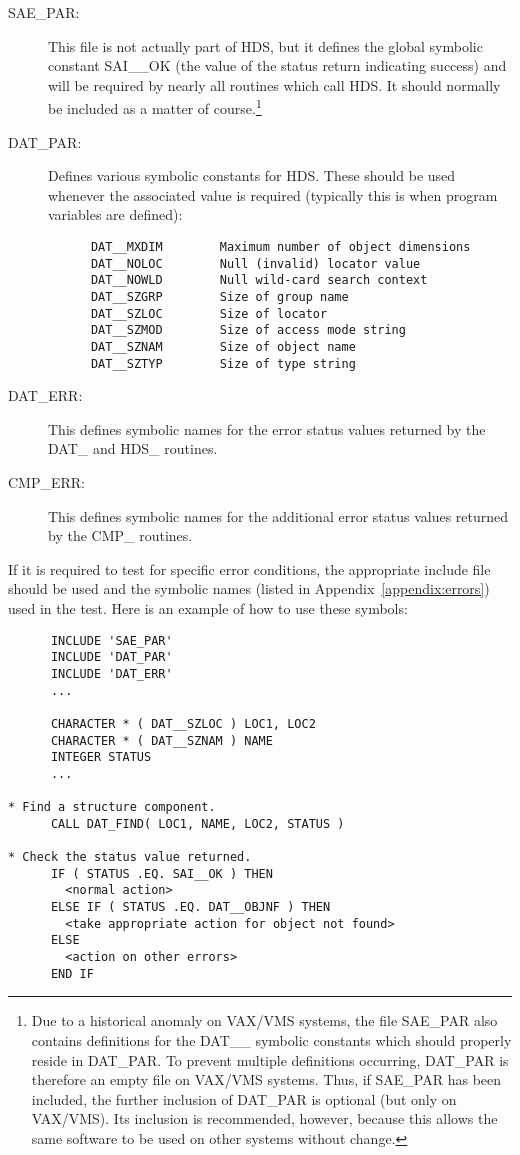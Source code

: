 \begin{description}

\item [SAE\_PAR:]
This file is not actually part of HDS, but it defines the global symbolic
constant SAI\_\_OK (the value of the status return indicating success) and will
be required by nearly all routines which call HDS. It should normally be
included as a matter of course.\footnote{Due to a historical anomaly on VAX/VMS
systems, the file SAE\_PAR also contains definitions for the DAT\_\_ symbolic
constants which should properly reside in DAT\_PAR. To prevent multiple
definitions occurring, DAT\_PAR is therefore an empty file on VAX/VMS systems.
Thus, if SAE\_PAR has been included, the further inclusion of DAT\_PAR is
optional (but only on VAX/VMS). Its inclusion is recommended, however, because
this allows the same software to be used on other systems without change.}

\item [DAT\_PAR:]
Defines various symbolic constants for HDS. These should be used whenever the
associated value is required (typically this is when program variables are
defined): 

\small
\begin{verbatim}
      DAT__MXDIM        Maximum number of object dimensions
      DAT__NOLOC        Null (invalid) locator value
      DAT__NOWLD        Null wild-card search context
      DAT__SZGRP        Size of group name
      DAT__SZLOC        Size of locator
      DAT__SZMOD        Size of access mode string
      DAT__SZNAM        Size of object name
      DAT__SZTYP        Size of type string
\end{verbatim}
\normalsize

\item [DAT\_ERR:]
This defines symbolic names for the error status values returned by the DAT\_ 
and HDS\_ routines.

\item [CMP\_ERR:]
This defines symbolic names for the additional error status values returned  by
the CMP\_ routines.
\end{description}

If it is required to test for specific error conditions, the appropriate
include file should be used and the symbolic names (listed in
Appendix~\ref{appendix:errors}) used in the test. Here is an example of how to
use these symbols: 

\small
\begin{verbatim}
      INCLUDE 'SAE_PAR'
      INCLUDE 'DAT_PAR'
      INCLUDE 'DAT_ERR'
      ...

      CHARACTER * ( DAT__SZLOC ) LOC1, LOC2
      CHARACTER * ( DAT__SZNAM ) NAME
      INTEGER STATUS
      ...

* Find a structure component.
      CALL DAT_FIND( LOC1, NAME, LOC2, STATUS )

* Check the status value returned.
      IF ( STATUS .EQ. SAI__OK ) THEN
        <normal action>
      ELSE IF ( STATUS .EQ. DAT__OBJNF ) THEN
        <take appropriate action for object not found>
      ELSE
        <action on other errors>
      END IF
\end{verbatim}
\normalsize

